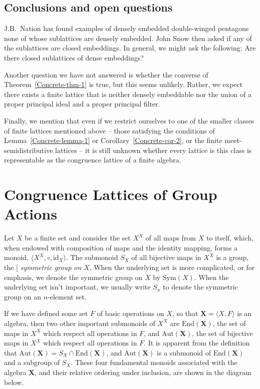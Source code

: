 \documentclass[cm,dissertation]{uhthesis}
\theoremstyle{plain}
\theoremstyle{definition}
\theoremstyle{remark}
\numberwithin{theorem}{section}
\numberwithin{claim}{chapter}
\numberwithin{equation}{section}
\numberwithin{conjecture}{chapter}
\newcommand{\<}{\ensuremath{\langle}}
\renewcommand{\>}{\ensuremath{\rangle}}
\newcommand{\End}{\ensuremath{\mathrm{End}}}
\newcommand{\Aut}{\ensuremath{\mathrm{Aut}}}
\newcommand{\Sym}{\ensuremath{\mathrm{Sym}}}
\newcommand{\0}{\ensuremath{\mathbf{0}}}
\newcommand{\1}{\ensuremath{\mathbf{1}}}
\newcommand{\2}{\ensuremath{\mathbf{2}}}
\newcommand{\3}{\ensuremath{\mathbf{3}}}
\newcommand{\4}{\ensuremath{\mathbf{4}}}
\newcommand{\5}{\ensuremath{\mathbf{5}}}
\newcommand{\bX}{\ensuremath{\mathbf{X}}}
\newcommand{\id}{\ensuremath{\mathrm{id}}}
\newcommand{\indexit}[1]{\index{#1|textit}}
\def\defn#1{\gdef\defnstring{#1}%
  \xdef\dodefnii{{\noexpand\em
       \defnstring}\noexpand\indexit{\defnstring}\noexpand\makeatother}%
  \futurelet\nextthing\dodefn}
\def\dodefn{%
  \ifx\nextthing[\let\next=\dodefni
    \else\let\next=\dodefnii\fi
  \makeatletter
  \next}
\def\dodefni[#1]{%
  {\em\defnstring}%
  \indexit{#1}%
  \makeatother}
\begin{document}
\section{Conclusions and open questions}

J.B.~Nation has found examples of densely embedded double-winged pentagons
  none of whose sublattices are densely embedded.  John Snow then asked if any
  of the sublattices are closed embeddings.  In general, we might ask the
  following: Are there closed sublattices of dense embeddings?

Another question we have not answered is whether the converse of
Theorem~\ref{Concrete-thm-1} is true, but this seems unlikely. Rather, we expect
there exists a finite lattice that is neither densely embeddable nor the union of
a proper principal ideal and a proper principal filter. 

Finally, we mention that even if we restrict ourselves to one of the smaller
classes of finite lattices mentioned above -- those satisfying the conditions of
Lemma~\ref{Concrete-lemma-1} or Corollary~\ref{Concrete-cor-2}, or the 
finite meet-semidistributive lattices -- it is still unknown whether every
lattice is this class is representable as the congruence lattice of a finite
algebra.  

\chapter{Congruence Lattices of Group Actions}
\label{cha:congr-latt-group}
Let $X$ be a finite set and consider the set $X^X$ of all maps from $X$ to
itself, which, when endowed with composition of maps and the identity mapping,
forms a monoid, $\<X^X, \circ, \id_X\>$.  The submonoid $S_X$ of all bijective
maps in $X^X$ is a group, the \defn{symmetric group on} $X$.  When the
underlying set is more complicated, or for emphasis, we denote the symmetric
group on $X$ by $\Sym(X)$.  When the  
underlying set isn't important, we usually write $S_n$ to denote the
symmetric group on an $n$-element set. 

If we have defined some set $F$ of basic operations on $X$, so that
$\bX = \<X, F\>$ is an algebra, then two other important submonoids of
$X^X$ are $\End(\bX)$, the set of maps in $X^X$ which respect all 
operations in $F$, and $\Aut(\bX)$, the set of bijective maps in  $X^X$ which
respect all operations in $F$.  It is apparent from the definition that
$\Aut(\bX)= S_X \cap \End(\bX)$, and  $\Aut(\bX)$ is a submonoid of $\End(\bX)$
and a subgroup of $S_X$.  These four fundamental monoids associated with the
algebra $\bX$, and their relative ordering under inclusion, are shown in the diagram
below. 
\end{document}

